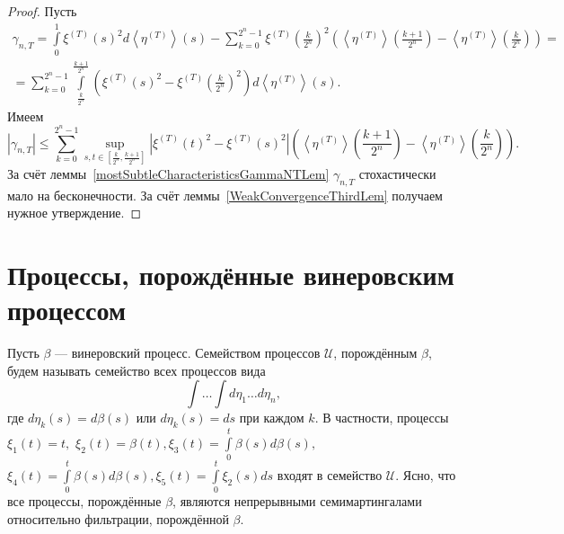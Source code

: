 \documentclass[12pt, a4paper, titlepage]{article}
\begin{document}
\begin{proof}
Пусть
 \begin{multline*}\gamma_{n, T}=
 \int\limits_0^1 \xi^{(T)}(s)^2d\left<\eta^{(T)}\right>(s)-
 \sum\limits_{k=0}^{2^n-1}\xi^{(T)}\left(\frac{k}{2^n}\right)^2\left(\left<\eta^{(T)}\right>
 \left(\frac{k+1}{2^n}\right)-\left<\eta^{(T)}\right>\left(\frac{k}{2^n}\right)\right)=\\=
 \sum\limits_{k=0}^{2^n-1}
 \int\limits_{\frac{k}{2^n}}^{\frac{k+1}{2^n}}
 \left(\xi^{(T)}(s)^2-\xi^{(T)}\left(\frac{k}{2^n}\right)^2\right)d\left<\eta^{(T)}\right>(s).
 \end{multline*} 
Имеем
$$
|\gamma_{n, T}| \le 
\sum\limits_{k=0}^{2^n-1}
 \sup\limits_{s, t \in [\frac{k}{2^n}, \frac{k+1}{2^n}]}
  \left|\xi^{(T)}(t)^2-\xi^{(T)}(s)^2\right|
 \left(
 \left<\eta^{(T)}\right>\left(\frac{k+1}{2^n}\right)-\left<\eta^{(T)}\right>\left(\frac{k}{2^n}\right)
 \right).
$$
  За счёт леммы~\ref{mostSubtleCharacteristicsGammaNTLem} $\gamma_{n,T}$
стохастически мало на бесконечности.  
 За счёт леммы~\ref{WeakConvergenceThirdLem} получаем нужное утверждение.
\end{proof}

\section{Процессы, порождённые винеровским процессом}
\begin{definition}
Пусть $\beta$ --- винеровский процесс. Семейством процессов $\mathcal U$, порождённым $\beta$, будем 
называть семейство всех процессов вида
$$\int \ldots \int d\eta_1 \ldots d\eta_n,$$
где $d\eta_k(s)=d\beta(s)$ или $d\eta_k(s)=ds$
при каждом $k$.
В частности, процессы
$\xi_1(t)=t,$  
$\xi_2(t)=\beta(t), \xi_3(t)=\int\limits_0^t \beta(s)d\beta(s),$
$\xi_4(t)=\int\limits_0^t \beta(s)d\beta(s),
\xi_5(t)=\int\limits_0^t \xi_2(s) ds$
входят в семейство $\mathcal U$. 
Ясно, что все процессы, порождённые $\beta$, являются
непрерывными семимартингалами относительно фильтрации, 
порождённой $\beta$.
\end{definition}

\begin{comment} 
Будем рассматривать следующее семейство процессов $\mathfrak{A}$, которое будем называть семейством 
процессов, порождённых $\beta.$
\begin{itemize}
 \item Процесс $\beta$ входит в $\mathfrak{A}$;
 \item если процесс $U$ входит в $\mathfrak{A}$, то процесс $V$,
 задаваемый равенством
 $$V_t=\int\limits_0^t U_s ds$$
 входит в $\mathfrak{A}$;
  \item если процесс $U$ входит в $\mathfrak{A}$, то процесс $V$,
 задаваемый равенством
 $$V_t=\int\limits_0^t U_s d\beta_s$$
 входит в $\mathfrak{A}$. 
\end{itemize}
\end{comment}
\end{document}

